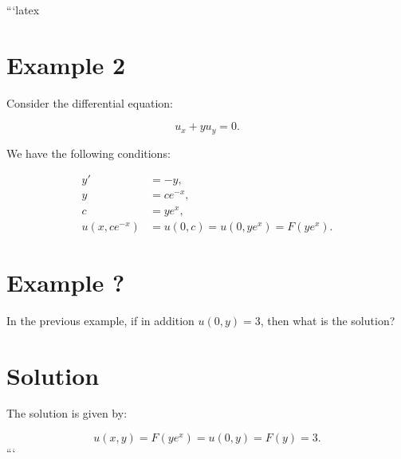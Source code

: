 ```latex
\section*{Example 2}

Consider the differential equation:

\begin{equation}
    u_x + y u_y = 0.
\end{equation}

We have the following conditions:

\begin{align}
    y' &= -y, \\
    y &= ce^{-x}, \\
    c &= y e^x, \\
    u(x, ce^{-x}) &= u(0, c) = u(0, y e^x) = F(y e^x).
\end{align}

\section*{Example ?}

In the previous example, if in addition \( u(0, y) = 3 \), then what is the solution?

\section*{Solution}

The solution is given by:

\begin{equation}
    u(x, y) = F(y e^x) = u(0, y) = F(y) = 3.
\end{equation}
```
